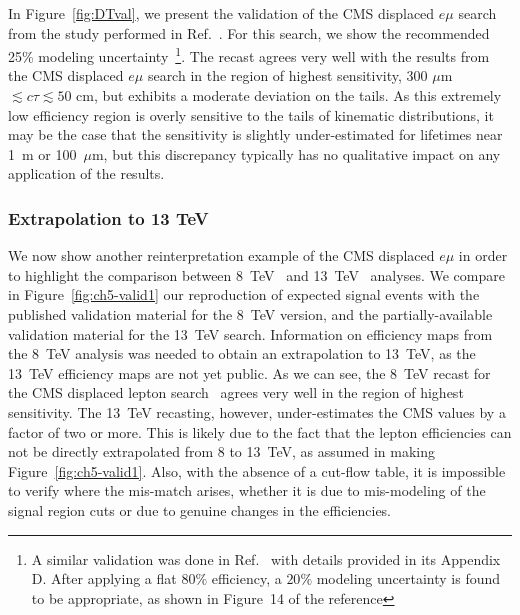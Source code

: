 In Figure~\ref{fig:DTval}, we present the validation of the CMS displaced $e\mu$
search~\cite{Khachatryan:2014mea} from the study performed
in Ref.~\cite{Evans:2016zau}. For this search, we show the recommended 25\% modeling
uncertainty~\footnote{A similar validation was done in Ref.~\cite{Liu:2015bma} with details
provided in its Appendix D. After applying a flat $80\%$ efficiency, a $20\%$ modeling uncertainty
is found to be appropriate, as shown in Figure~14 of the reference}. The recast agrees
very well with the results from the CMS displaced
$e\mu$ search in the region of highest sensitivity, 300 $\mu$m $\lesssim c\tau
\lesssim 50$ cm, but exhibits a moderate deviation on the tails. As this
extremely low efficiency region is overly sensitive to the tails of kinematic
distributions, it may be the case that the sensitivity is slightly under-estimated
for lifetimes near 1~m or 100~$\mu$m, but this discrepancy typically has no
qualitative impact on any application of the results.

\subsubsection{Extrapolation to 13 TeV}

We now show another reinterpretation example of the CMS displaced $e\mu$ in
order to highlight the comparison between 8~TeV~\cite{Khachatryan:2014mea} and 
13~TeV~\cite{CMS-PAS-EXO-16-022} analyses. We compare in
Figure~\ref{fig:ch5-valid1} our reproduction of expected signal events with the
published validation material for the 8~TeV version, and the partially-available
validation material for the 13~TeV search.
Information on efficiency maps from the 8~TeV analysis was needed
to obtain an extrapolation to 13~TeV, as the 13~TeV efficiency
 maps are not yet public.
As we can see, the 8~TeV recast for the CMS displaced lepton
search~\cite{Khachatryan:2014mea} agrees very well in the region of highest
sensitivity. The 13~TeV recasting, however, under-estimates the CMS values
by a factor of two or more. This is likely due to the fact that the
lepton efficiencies can not be directly extrapolated from 8 to 13~TeV,
as assumed in making Figure~\ref{fig:ch5-valid1}.
Also, with the absence of a cut-flow table, it is impossible to verify where the
mis-match arises, whether it is due to mis-modeling of the signal region
cuts or  due to genuine changes in the efficiencies.

